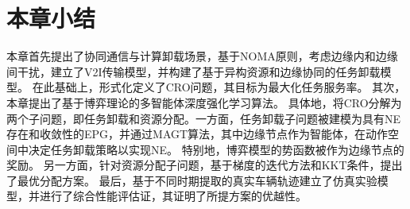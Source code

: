 \section[\hspace{-2pt}本章小结]{{ \hspace{-8pt}本章小结}}\label{section 3-6}

本章首先提出了协同通信与计算卸载场景，基于NOMA原则，考虑边缘内和边缘间干扰，建立了V2I传输模型，并构建了基于异构资源和边缘协同的任务卸载模型。
在此基础上，形式化定义了CRO问题，其目标为最大化任务服务率。
其次，本章提出了基于博弈理论的多智能体深度强化学习算法。
具体地，将CRO分解为两个子问题，即任务卸载和资源分配。一方面，任务卸载子问题被建模为具有NE存在和收敛性的EPG，并通过MAGT算法，其中边缘节点作为智能体，在动作空间中决定任务卸载策略以实现NE。
特别地，博弈模型的势函数被作为边缘节点的奖励。
另一方面，针对资源分配子问题，基于梯度的迭代方法和KKT条件，提出了最优分配方案。
最后，基于不同时期提取的真实车辆轨迹建立了仿真实验模型，并进行了综合性能评估证，其证明了所提方案的优越性。